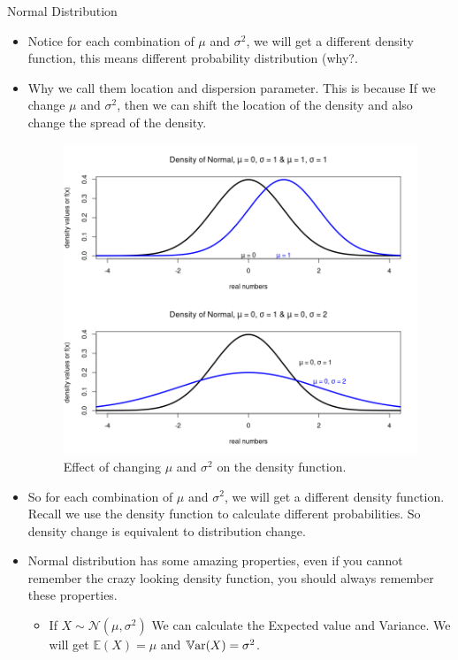 \documentclass[8pt, usepdftitle=false]{beamer}
\begin{document}
\begin{frame}[allowframebreaks]{Normal Distribution}
\begin{itemize}
\item Notice for each combination of $\mu$ and $\sigma^2$, we will get a different density function, this means different probability distribution (why?.

\item Why we call them \alert{location} and \alert{dispersion} parameter. This is because If we change $\mu$ and $\sigma^2$, then we can shift the location of the density and also change the spread of the density.

\begin{figure}
\centering
\includegraphics[scale = .3]{Images/Normal_density_parameter_change.png}
\caption{Effect of changing $\mu$ and $\sigma^2$ on the density function.}
\end{figure}

\item So for each combination of $\mu$ and $\sigma^2$, we will get a different density function. Recall we use the density function to calculate different probabilities. So density change is equivalent to distribution change.

\framebreak


\item Normal distribution has some amazing properties, even if you cannot remember the crazy looking density function, you should always remember these properties.

\begin{itemize}
\item If $X \sim \mathcal{N}(\mu, \sigma^2)$ We can calculate the Expected value and Variance. We will get $\mathbb{E}(X) = \mu$ and $\mathbb{V}\mathrm{ar}{(}X) = \sigma^2$.


\end{itemize}
\end{itemize}
\end{frame}
\end{document}

